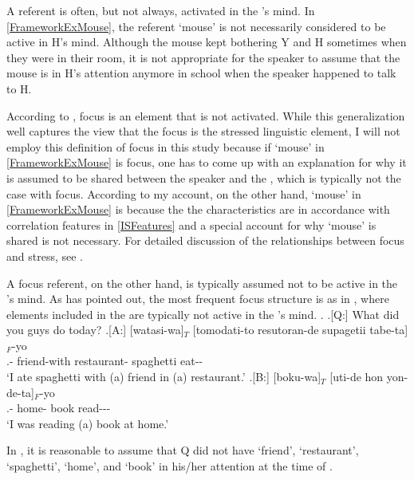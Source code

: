 A  referent is often, but not always, activated in the 's mind.
In \ref{FrameworkExMouse},
the referent `mouse' is not necessarily considered to be active in H's mind.
Although the mouse kept bothering Y and H sometimes when they were in their room,
it is not appropriate for the speaker to assume that the mouse is in H's attention anymore in school when the speaker happened to talk to H.

According to ,
focus is an element that is not activated.
While this generalization well captures the view that the focus is the stressed linguistic element,
I will not employ this definition of focus in this study
because if  `mouse' in \ref{FrameworkExMouse} is focus,
one has to come up with an explanation for why it is assumed to be shared between the speaker and the ,
which is typically not the case with focus.
According to my account, on the other hand,
 `mouse' in \ref{FrameworkExMouse} is  because the the characteristics are in accordance with  correlation features in \ref{ISFeatures}
and a special account for why  `mouse' is shared is not necessary.
For detailed discussion of the relationships between focus and stress,
see .

A focus referent, on the other hand, is typically assumed not to be active in the 's mind.
As  has pointed out,
the most frequent focus structure is  as in \Next[A,B],
where elements included in the  are typically not active in the 's mind.
\ex.\label{tomodati} \a.[Q:] What did you guys do today?
	\bg.[A:] [watasi-wa]$_{T}$ [tomodati-to resutoran-de supagetii tabe-ta]$_{F}$-yo \\
			.- friend-with restaurant- spaghetti eat-- \\
			`I ate spaghetti with (a) friend in (a) restaurant.'
	\bg.[B:] [boku-wa]$_{T}$ [uti-de hon yon-de-ta]$_{F}$-yo \\
			.- home- book read--- \\
			`I was reading (a) book at home.'

In \Last,
it is reasonable to assume that
Q did not have `friend', `restaurant', `spaghetti', `home', and `book' in his/her attention at the time of  \Last[Q].

